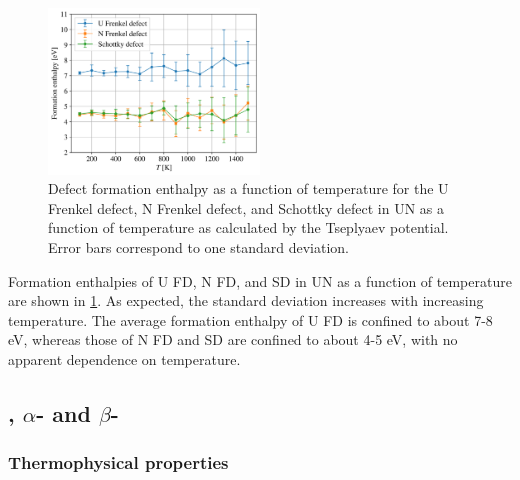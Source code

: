 \documentclass[preprint, 12pt]{elsarticle}
\begin{document}
\begin{figure}[h!]
    \centering
    \includegraphics[width=0.50\textwidth]{FD-SD-T.png}
    \caption{Defect formation enthalpy as a function of temperature for the U Frenkel defect, N Frenkel defect, and Schottky defect in UN as a function of temperature as calculated by the Tseplyaev potential. Error bars correspond to one standard deviation.}
    \label{Fig:EfvsT}
\end{figure}

Formation enthalpies of U FD, N FD, and SD in UN as a function of temperature are shown in \cref{Fig:EfvsT}. As expected, the standard deviation increases with increasing temperature. The average formation enthalpy of U FD is confined to about 7-8 eV, whereas those of N FD and SD are confined to about 4-5 eV, with no apparent dependence on temperature.



\subsection{, $\alpha$- and $\beta$-}

\subsubsection{Thermophysical properties}
\end{document}
